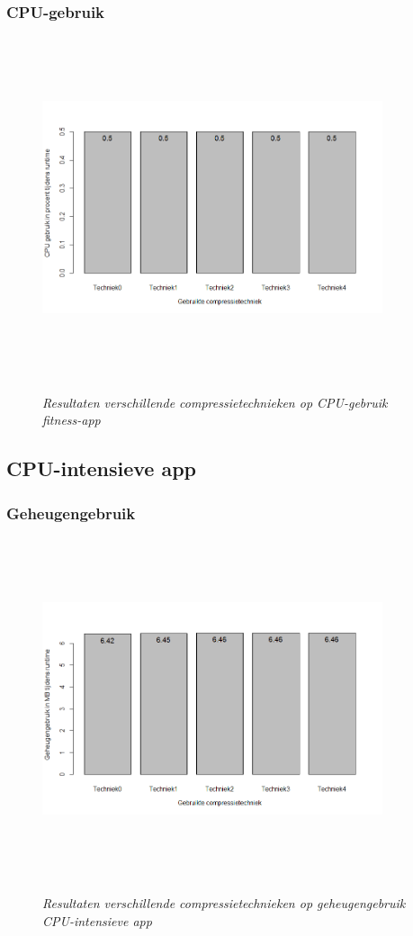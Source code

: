 \subsubsection{CPU-gebruik}
\begin{figure}[H]
	\centering
	\caption{\textit{Resultaten verschillende compressietechnieken op CPU-gebruik fitness-app}}
	\includegraphics[width=10cm, height=10cm, keepaspectratio]{img/app2cpu}\\[.5cm]
	
\end{figure}
\subsection{CPU-intensieve app}
\subsubsection{Geheugengebruik}
\begin{figure}[H]
	\centering
	\caption{\textit{Resultaten verschillende compressietechnieken op geheugengebruik CPU-intensieve app}}
	\includegraphics[width=10cm, height=10cm, keepaspectratio]{img/app3geheugen}\\[.5cm]
	
\end{figure}
